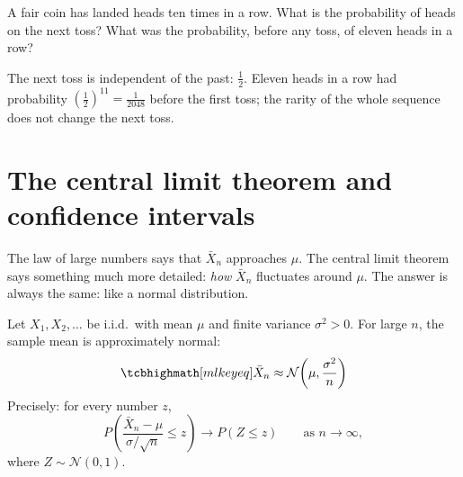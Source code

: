 \begin{exercise}
A fair coin has landed heads ten times in a row. What is the probability of heads
on the next toss? What was the probability, before any toss, of eleven heads in a
row?
\end{exercise}
\begin{solution}
The next toss is independent of the past: $\tfrac12$. Eleven heads in a row had
probability $\left(\tfrac12\right)^{11} = \tfrac{1}{2048}$ before the first toss;
the rarity of the whole sequence does not change the next toss.
\end{solution}

\section{The central limit theorem and confidence intervals}\label{sec:clt}

The law of large numbers says that $\bar X_n$ approaches $\mu$. The central limit
theorem says something much more detailed: \emph{how} $\bar X_n$ fluctuates
around $\mu$. The answer is always the same: like a normal distribution.

\begin{theorem}\label{thm:clt}
Let $X_1, X_2, \dots$ be i.i.d.\ with mean $\mu$ and finite variance
$\sigma^2 > 0$. For large $n$, the sample mean is approximately normal:
\[
  \keyeq{\bar X_n \approx \mathcal{N}\!\left(\mu, \frac{\sigma^2}{n}\right)}
\]
Precisely: for every number $z$,
\[
  P\left(\frac{\bar X_n - \mu}{\sigma/\sqrt n} \le z\right) \to P(Z \le z)
  \qquad\text{as } n \to \infty,
\]
where $Z \sim \mathcal{N}(0, 1)$.
\end{theorem}

